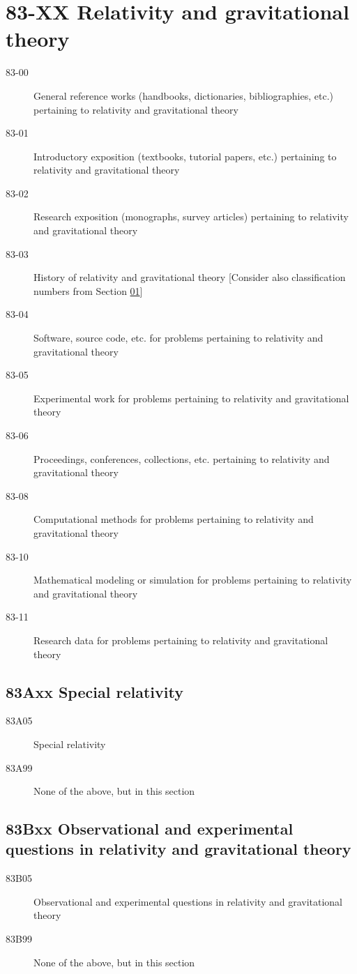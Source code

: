 \documentclass[letterpaper]{article}
\begin{document}
\section*{83-XX Relativity and gravitational theory }\label{83-XX}
\begin{description}
\item [83-00]\label{83-00} General reference works (handbooks, dictionaries, bibliographies, etc.) pertaining to relativity and gravitational theory
\item [83-01]\label{83-01} Introductory exposition (textbooks, tutorial papers, etc.) pertaining to relativity and gravitational theory
\item [83-02]\label{83-02} Research exposition (monographs, survey articles) pertaining to relativity and gravitational theory
\item [83-03]\label{83-03} History of relativity and gravitational theory [Consider also classification numbers from Section \hyperref[01-XX]{01}]
\item [83-04]\label{83-04} Software, source code, etc. for problems pertaining to relativity and gravitational theory
\item [83-05]\label{83-05} Experimental work for problems pertaining to relativity and gravitational theory
\item [83-06]\label{83-06} Proceedings, conferences, collections, etc. pertaining to relativity and gravitational theory
\item [83-08]\label{83-08} Computational methods for problems pertaining to relativity and gravitational theory
\item [83-10]\label{83-10} Mathematical modeling or simulation for problems pertaining to relativity and gravitational theory
\item [83-11]\label{83-11} Research data for problems pertaining to relativity and gravitational theory
\end{description}
\subsection*{83Axx  Special relativity }\label{83Axx}
\begin{description}  
\item [83A05]\label{83A05} Special relativity
\item [83A99]\label{83A99} None of the above, but in this section
\end{description}
\subsection*{83Bxx  Observational and experimental questions in relativity and gravitational theory }\label{83Bxx}
\begin{description}  
\item [83B05]\label{83B05} Observational and experimental questions in relativity and gravitational theory
\item [83B99]\label{83B99} None of the above, but in this section
\end{description}
\end{document}

